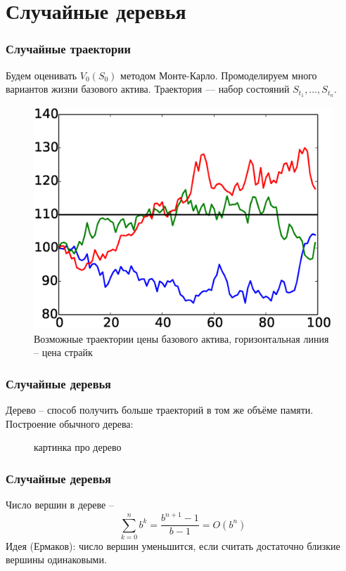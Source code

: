 \documentclass[unicode, notheorems]{beamer}
\begin{document}
\section{Случайные деревья}
    \begin{frame}
        \frametitle{Случайные траектории}
        Будем оценивать $V_0(S_0)$ методом Монте-Карло.
        Промоделируем много вариантов жизни базового актива. Траектория --- набор состояний $S_{t_1}, \ldots, S_{t_n}$.
        \begin{figure}[h]
            \includegraphics[height=0.5\paperheight]{traces}
            \caption{Возможные траектории цены базового актива, горизонтальная линия -- цена страйк}
            \label{fig:traces}
        \end{figure}
    \end{frame}

\begin{frame}
    \frametitle{Случайные деревья}
    Дерево -- способ получить больше траекторий в том же объёме памяти. Построение обычного дерева:
    \begin{figure}[h]
        картинка про дерево
    \end{figure}
\end{frame}

\begin{frame}
    \frametitle{Случайные деревья}
    Число вершин в дереве -- $$\sum_{k=0}^n b^k = \frac{b^{n+1} - 1}{b-1} = O(b^n)$$
    Идея (Ермаков): число вершин уменьшится, если считать достаточно близкие вершины одинаковыми.
\end{frame}
\end{document}
